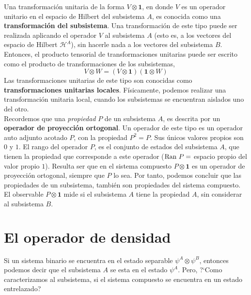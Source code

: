 \documentclass[12pt]{book}
\numberwithin{equation}{chapter}
\def\H{\mathcal{H}}
\def\pr{\otimes}
\def\1{\mathbf{1}}
\begin{document}
Una transformaci\'on unitaria de la forma $V \pr \1$, en donde $V$ es un operador unitario en el espacio de Hilbert del subsistema $A$, es conocida como una {\bf transformaci\'on del subsistema}. Una transformaci\'on de este tipo puede ser realizada aplicando el operador $V$ al subsistema $A$ (esto es, a los vectores del espacio de Hilbert $\H^{A}$), sin hacerle nada a los vectores del subsistema $B$. Entonces, el producto tensorial de transformaciones unitarias puede ser escrito como el producto de transformaciones de los subsistemas, 
\begin{equation}
V \pr W = (V \pr \1)(\1 \pr W)
\end{equation}
Las transformaciones unitarias de este tipo son conocidas como {\bf transformaciones unitarias locales}. F\'isicamente, podemos realizar una transformaci\'on unitaria local, cuando los subsistemas se encuentran aislados uno del otro. \\

Recordemos que una \emph{propiedad} $P$ de un subsistema $A$, es descrita por un {\bf operador de proyecci\'on ortogonal}. Un operador de este tipo es un operador auto adjunto acotado $P$, con la propiedad $P^{2}=P$. Sus \'unicos valores propios son $0$ y $1$. El rango del operador $P$, es el conjunto de estados del subsistema $A$, que tienen la propiedad que corresponde a este operador ($\hbox{Ran }P=$ espacio propio del valor propio $1$). Resulta ser que en el sistema compuesto $P \pr \1$ es un operador de proyecci\'on ortogonal, siempre que $P$ lo sea. Por tanto, podemos concluir que las propiedades de un subsistema, tambi\'en son propiedades del sistema compuesto. El observable $P \pr \1$ mide si el subsistema $A$ tiene la propiedad $A$, sin considerar al subsistema $B$.

\section{El operador de densidad}
Si un sistema binario se encuentra en el estado separable $ \psi^{A} \pr \psi^{B} $, entonces podemos decir que el subsistema $A$ se esta en el estado $\psi^{A}$. Pero, ?`Como caracterizamos al subsistema, si el sistema compuesto se encuentra en un estado entrelazado?
\end{document}
